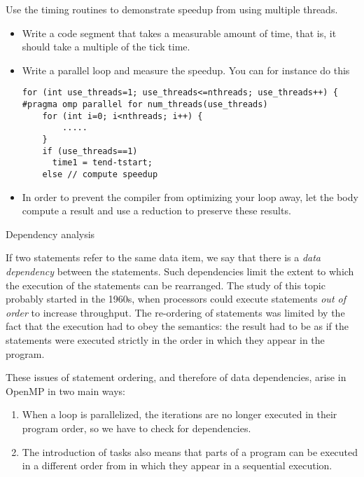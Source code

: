 \begin{exercise}
  Use the timing routines to demonstrate speedup from using
  multiple threads.
  \begin{itemize}
  \item Write a code segment that takes a measurable amount of time, that is,
    it should take a multiple of the tick time.
  \item Write a parallel loop and measure the speedup. You can for instance do this
\begin{verbatim}
for (int use_threads=1; use_threads<=nthreads; use_threads++) {
#pragma omp parallel for num_threads(use_threads)
    for (int i=0; i<nthreads; i++) {
        .....
    }
    if (use_threads==1)
      time1 = tend-tstart;
    else // compute speedup
\end{verbatim}
\item In order to prevent the compiler from optimizing your loop away, let
  the body compute a result and use a reduction to preserve these results.
  \end{itemize}
\end{exercise}

 {Dependency analysis}

If two statements refer to the same data item,
we say that there is a \emph{data dependency} between
the statements. Such dependencies limit the extent to which
the execution of the statements can be  rearranged.
The study of this topic probably started in the 1960s,
when processors could execute statements \emph{out of order}
to increase throughput. The re-ordering of statements
was limited by the fact that the execution
had to obey the  semantics:
the result had to be as if the statements were executed
strictly in the order in which they appear in the program.

These issues of statement ordering, and therefore of
data dependencies, arise in OpenMP in two main ways:
\begin{enumerate}
\item When a loop is parallelized, the iterations are no longer
  executed in their program order, so we have to check for dependencies.
\item The introduction of tasks also means that parts of a program
  can be executed in a different order from in which they appear
  in a sequential execution.
\end{enumerate}

